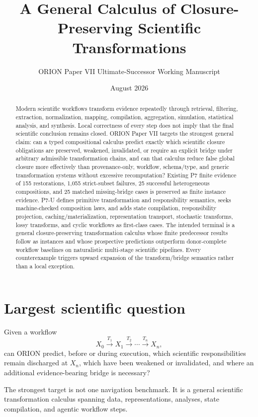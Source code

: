 \documentclass[11pt]{article}
\title{A General Calculus of Closure-Preserving Scientific Transformations}
\author{ORION Paper VII Ultimate-Successor Working Manuscript}
\date{August 2026}
\begin{document}
\maketitle

\begin{abstract}
Modern scientific workflows transform evidence repeatedly through retrieval, filtering, extraction, normalization, mapping, compilation, aggregation, simulation, statistical analysis, and synthesis. Local correctness of every step does not imply that the final scientific conclusion remains closed. ORION Paper VII targets the strongest general claim: can a typed compositional calculus predict exactly which scientific closure obligations are preserved, weakened, invalidated, or require an explicit bridge under arbitrary admissible transformation chains, and can that calculus reduce false global closure more effectively than provenance-only, workflow, schema/type, and generic transformation systems without excessive recomputation? Existing P7 finite evidence of 155 restorations, 1,055 strict-subset failures, 25 successful heterogeneous compositions, and 25 matched missing-bridge cases is preserved as finite instance evidence. P7-U defines primitive transformation and responsibility semantics, seeks machine-checked composition laws, and adds state compilation, responsibility projection, caching/materialization, representation transport, stochastic transforms, lossy transforms, and cyclic workflows as first-class cases. The intended terminal is a general closure-preserving transformation calculus whose finite predecessor results follow as instances and whose prospective predictions outperform donor-complete workflow baselines on naturalistic multi-stage scientific pipelines. Every counterexample triggers upward expansion of the transform/bridge semantics rather than a local exception.
\end{abstract}

\section{Largest scientific question}
Given a workflow
\[
X_0 \xrightarrow{T_1} X_1 \xrightarrow{T_2} \cdots \xrightarrow{T_n} X_n,
\]
can ORION predict, before or during execution, which scientific responsibilities remain discharged at $X_n$, which have been weakened or invalidated, and where an additional evidence-bearing bridge is necessary?

The strongest target is not one navigation benchmark. It is a general scientific transformation calculus spanning data, representations, analyses, state compilation, and agentic workflow steps.
\end{document}
